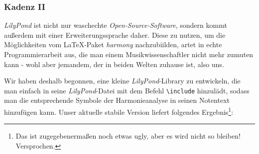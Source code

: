 \subsubsection{Kadenz II}

\emph{LilyPond} ist nicht nur waschechte \emph{Open-Source-Software}, sondern
kommt außerdem mit einer Erweiterungssprache daher. Diese zu nutzen, um die
Möglichkeiten vom \LaTeX-Paket \emph{harmony} nachzubiilden, artet in echte
Programmierarbeit aus, die man einem Musikwissenschaftler nicht mehr zumuten
kann - wohl aber jemandem, der in beiden Welten zuhause ist, also uns.

Wir haben deshalb begonnen, eine kleine \emph{LilyPond}-Library zu entwickeln,
die man einfach in seine \emph{LilyPond}-Datei mit dem Befehl
\texttt{\textbackslash{include}} hinzulädt, sodass man die entsprechende Symbole
der Harmonieanalyse in seinen Notentext hinzufügen kann. Unser aktuelle stabile
Version liefert folgendes Ergebnis\footnote{Das ist zugegebenermaßen noch etwas
ugly, aber es wird nicht so bleiben! Versprochen.}:


\begin{center}
\end{center}

